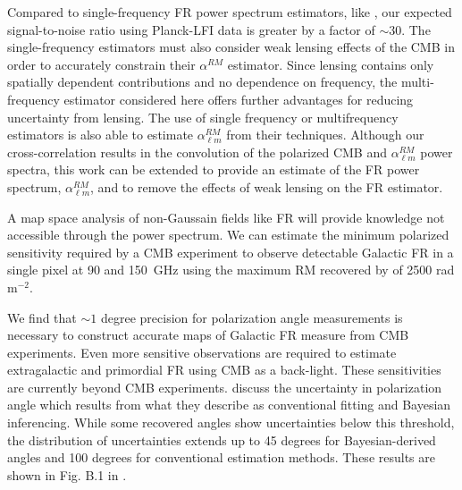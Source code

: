 \documentclass[usenatbib,hidelinks]{mnras}
\begin{document}
{Compared to single-frequency FR power spectrum estimators, like \citet{De:2013}, our expected signal-to-noise ratio using Planck-LFI data is greater by a factor of $\sim30$. The single-frequency estimators must also consider weak lensing effects of the CMB in order to accurately constrain their $\alpha^{RM}$ estimator. Since lensing contains only spatially dependent contributions \citep{Lewis:2006fu} and no dependence on frequency, the multi-frequency estimator considered here offers further advantages for reducing uncertainty from lensing. 
The use of single frequency or multifrequency estimators \citep{De:2013,pogosian:2013} is also able to estimate $\alpha^{RM}_{\ell m}$ from their techniques.
Although our cross-correlation results in the convolution of the polarized CMB and $\alpha^{RM}_{\ell m}$ power spectra, this work can be extended to provide an estimate of the FR power spectrum, $\alpha^{RM}_{\ell m}$, and to remove the effects of weak lensing on the FR estimator. 



A map space analysis of non-Gaussain fields like FR will provide knowledge not accessible through the power spectrum. We can estimate the minimum polarized sensitivity required by a CMB experiment to observe detectable Galactic FR in a single pixel at 90 and 150~GHz using the maximum RM recovered by \citet{Oppermann:2014} of 2500 rad m$^{-2}$.


 We find that $\sim 1$ degree precision for polarization angle measurements is necessary to construct accurate maps of Galactic FR measure from CMB experiments. 
Even more sensitive observations are required to estimate extragalactic and primordial FR using CMB as a back-light. 
These sensitivities are currently beyond CMB experiments. 
\citet{planck:2015dust} discuss the uncertainty in
polarization angle which results from what they describe as conventional fitting and 
Bayesian inferencing. While some recovered angles show uncertainties
below this threshold, the distribution of uncertainties extends
up to 45 degrees for Bayesian-derived angles and 100 degrees for 
conventional estimation methods. These results are shown in Fig. B.1 in \cite{planck:2015dust}.



}
\end{document}
